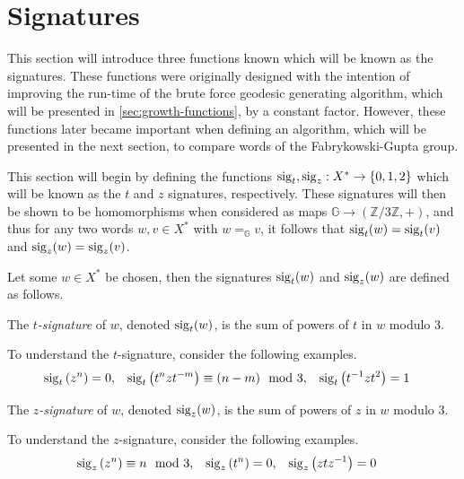 \section{Signatures}

This section will introduce three functions known which will be known as the signatures.
These functions were originally designed with the intention of improving the run-time of the brute force geodesic generating algorithm, which will be presented in \cref{sec:growth-functions}, by a constant factor.
However, these functions later became important when defining an algorithm, which will be presented in the next section, to compare words of the Fabrykowski-Gupta group.

This section will begin by defining the functions $\operatorname{sig}_t,\operatorname{sig}_z : X^\ast \to \left\lbrace 0, 1, 2 \right\rbrace$ which will be known as the $t$ and $z$ signatures, respectively.
These signatures will then be shown to be homomorphisms when considered as maps $\mathbb{G} \to (\mathbb{Z}/3\mathbb{Z}, +)$, and thus for any two words $w,v \in X^\ast$ with $w =_\mathbb{G} v$, it follows that $\operatorname{sig}_t(w) = \operatorname{sig}_t(v)$ and $\operatorname{sig}_z(w) = \operatorname{sig}_z(v)$.

Let some $w \in X^\ast$ be chosen, then the signatures $\operatorname{sig}_t(w)$ and $\operatorname{sig}_z(w)$ are defined as follows.

\begin{definition}
	\label{def:t-signature}
	The \emph{$t$-signature} of $w$, denoted $\operatorname{sig}_t(w)$, is the sum of powers of $t$ in $w$ modulo 3.
\end{definition}

\begin{example}
	To understand the $t$-signature, consider the following examples.
	\begin{align*}
	  \operatorname{sig}_t\left( z^n \right)         &= 0,             &
	  \operatorname{sig}_t\left( t^nzt^{-m} \right)         &\equiv (n-m) \mod 3, &
	  \operatorname{sig}_t\left( t^{-1}z t^2 \right) &= 1
	\end{align*}
\end{example}

\begin{definition}
	\label{def:z-signature}
	The \emph{$z$-signature} of $w$, denoted $\operatorname{sig}_z(w)$, is the sum of powers of $z$ in $w$ modulo 3.
\end{definition}

\begin{example}
	To understand the $z$-signature, consider the following examples.
	\begin{align*}
	\operatorname{sig}_z\left( z^n \right)     &\equiv n \mod 3, &
	\operatorname{sig}_z\left( t^n \right)     &= 0,             &
	\operatorname{sig}_z\left( z t z^{-1}\right) &= 0
	\end{align*}
	\thmendmark
\end{example}

